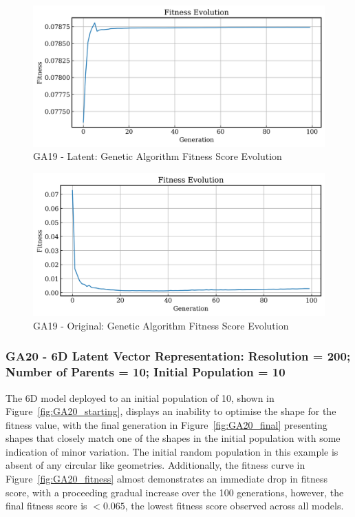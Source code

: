 \documentclass{article}
\begin{document}
\begin{figure}[H]
    \centering
    \includegraphics[width=0.75\linewidth]{figures/GAResults/GA19/latent/100gen_fitness.png}
    \caption{GA19 - Latent: Genetic Algorithm Fitness Score Evolution}
    \label{fig:GA19_latent_fitness}
\end{figure}
\begin{figure}[H]
    \centering
    \includegraphics[width=0.75\linewidth]{figures/GAResults/GA19/original/original_fitness.png}
    \caption{GA19 - Original: Genetic Algorithm Fitness Score Evolution}
    \label{fig:GA19_original_fitness}
\end{figure}

\subsubsection*{GA20 - 6D Latent Vector Representation: Resolution = 200; Number of Parents = 10; Initial Population = 10}
The 6D model deployed to an initial population of 10, shown in Figure~\ref{fig:GA20_starting}, displays an inability to optimise the shape for the fitness value, with the final generation in Figure~\ref{fig:GA20_final} presenting shapes that closely match one of the shapes in the initial population with some indication of minor variation. The initial random population in this example is absent of any circular like geometries. Additionally, the fitness curve in Figure~\ref{fig:GA20_fitness} almost demonstrates an immediate drop in fitness score, with a proceeding gradual increase over the 100 generations, however, the final fitness score is $< 0.065$, the lowest fitness score observed across all models.
\end{document}
